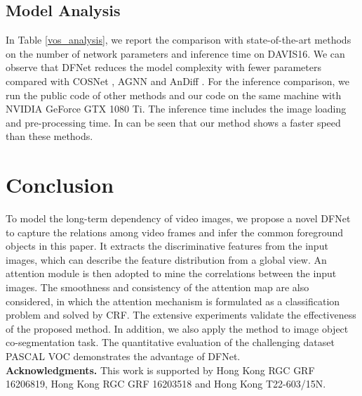 \documentclass[runningheads]{llncs}
\begin{document}
\subsection{Model Analysis}\label{exp_analysis}
In Table \ref{vos_analysis}, we report the comparison with state-of-the-art methods on the number of network parameters  and inference time on DAVIS16. We can observe that DFNet reduces the model complexity with fewer parameters compared with COSNet \cite{vos_cosnet}, AGNN \cite{vos_agnn} and AnDiff \cite{vos_andiff}. For the inference comparison, we run the public code of other methods and our code on the same machine with  NVIDIA GeForce GTX 1080 Ti. The inference time includes the image loading and pre-processing time. In can be seen that our method shows a faster speed than these methods.
\begin{table*}[t!]
	\caption{The number of model parameters and inference time comparison with state-of-the-art methods.}
\centering
	\label{vos_analysis}
\end{table*}
\section{Conclusion}
To model the long-term dependency of video images, we propose a novel DFNet to capture the relations among video frames and infer the common foreground objects in this paper. It extracts the discriminative features from the input images, which can describe the feature distribution from a global view. An attention module is then adopted to mine the correlations between the input images.
The smoothness and consistency of the attention map are also considered, in which  the attention mechanism is  formulated as a classification problem and solved by CRF. The extensive experiments validate the effectiveness of the proposed method. In addition, we also apply the method to image object co-segmentation task. The quantitative evaluation of the challenging dataset PASCAL VOC demonstrates the advantage of DFNet. \\
\textbf{Acknowledgments.} This work is supported by Hong Kong RGC GRF 16206819, Hong Kong RGC GRF 16203518 and Hong
Kong T22-603/15N.















\clearpage


\end{document}
